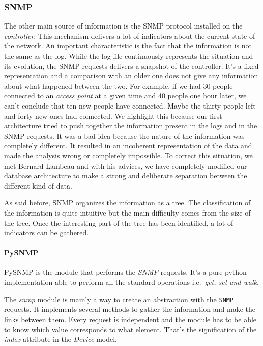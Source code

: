 \subsubsection{SNMP}
The other main source of information is the SNMP protocol installed on the \emph{controller}. This mechanism delivers a lot of indicators about the current state of the network. An important characteristic is the fact that the information is not the same as the log. While the log file continuously represents the situation and its evolution, the SNMP requests delivers a snapshot of the controller. It's a fixed representation and a comparison with an older one does not give any information about what happened between the two. For example, if we had 30 people connected to an \emph{access point} at a given time and 40 people one hour later, we can't conclude that ten new people have connected. Maybe the thirty people left and forty new ones had connected. We highlight this because our first architecture tried to push together the information present in the logs and in the SNMP requests. It was a bad idea because the nature of the information was completely different. It resulted in an incoherent representation of the data and made the analysis wrong or completely impossible. To correct this situation, we met Bernard Lambeau and with his advices, we have completely modified our database architecture to make a strong and deliberate separation between the different kind of data.

As said before, SNMP organizes the information as a tree. The classification of the information is quite intuitive but the main difficulty comes from the size of the tree. Once the interesting part of the tree has been identified, a lot of indicators can be gathered.

\paragraph{PySNMP} PySNMP is the module that performs the \emph{SNMP} requests. It's a pure python implementation able to perform all the standard operations i.e.\  \emph{get, set and walk}.

The \emph{snmp} module is mainly a way to create an abstraction with the \texttt{SNMP} requests. It implements several methods to gather the information and make the links between them. Every request is independent and the module has to be able to know which value corresponds to what element. That's the signification of the \emph{index} attribute in the \emph{Device} model.

